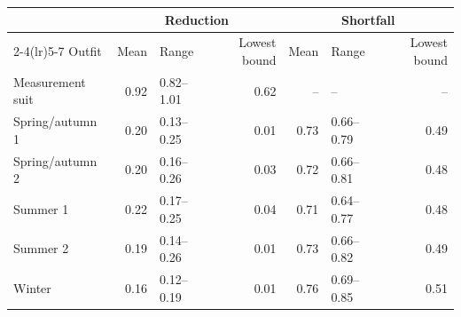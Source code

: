 \begin{tabular}{lrlrrlr}
\toprule
 & \multicolumn{3}{c}{Reduction} & \multicolumn{3}{c}{Shortfall} \\
\cmidrule(lr){2-4}\cmidrule(lr){5-7}
Outfit & Mean & Range & Lowest bound & Mean & Range & Lowest bound \\
\midrule
Measurement suit & 0.92 & 0.82--1.01 & 0.62 & -- & -- & -- \\
Spring/autumn 1 & 0.20 & 0.13--0.25 & 0.01 & 0.73 & 0.66--0.79 & 0.49 \\
Spring/autumn 2 & 0.20 & 0.16--0.26 & 0.03 & 0.72 & 0.66--0.81 & 0.48 \\
Summer 1 & 0.22 & 0.17--0.25 & 0.04 & 0.71 & 0.64--0.77 & 0.48 \\
Summer 2 & 0.19 & 0.14--0.26 & 0.01 & 0.73 & 0.66--0.82 & 0.49 \\
Winter & 0.16 & 0.12--0.19 & 0.01 & 0.76 & 0.69--0.85 & 0.51 \\
\bottomrule
\end{tabular}
